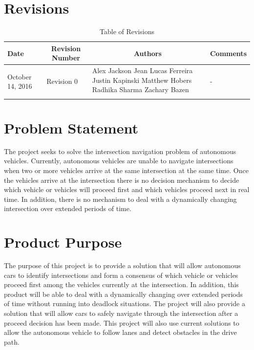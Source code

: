 \documentclass [12pt]{article}
\begin{document}

\tableofcontents
\listoftables

\pagebreak


\section{Revisions}
\begin{longtable}{| p{ } | p{ } | p{ } | p{ } |}

\hline 
\centering \textbf{Date} & 
\multicolumn{1}{c}{\textbf {Revision Number}} &
\multicolumn{1}{|c}{\textbf {Authors}} & 
\multicolumn{1}{|c|}{\textbf {Comments}} \\ \hline

\multirow{4}{*}{\centering October 14, 2016}  & 
\multirow{4}{*}{Revision 0}& 
{Alex Jackson \newline
		Jean Lucas Ferreira \newline
		Justin Kapinski\newline
		Matthew Hobers\newline
		Radhika Sharma\newline
		Zachary Bazen}
 &
\multirow{4}{*}{-} \\ 
\hline 

\caption{Table of Revisions} 
\end{longtable}

\pagebreak

\section{Problem Statement}
The project seeks to solve the intersection navigation problem of autonomous vehicles. Currently, autonomous vehicles are unable to navigate intersections when two or more vehicles arrive at the same intersection at the same time. Once the vehicles arrive at the intersection there is no decision mechanism to decide which vehicle or vehicles will proceed first and which vehicles proceed next in real time. In addition, there is no mechanism to deal with a dynamically changing intersection over extended periods of time.

\section{Product Purpose}
The purpose of this  project is to provide a solution that will allow autonomous cars to identify intersections and form a consensus of which vehicle or vehicles proceed first among the vehicles currently at the  intersection. In addition, this product will be able to deal with a dynamically changing over extended periods of time without running into deadlock situations. The project will also provide a solution that will allow cars to safely navigate through the intersection after a proceed decision has been made. This project will also use current solutions to allow the autonomous vehicle to follow lanes and detect obstacles in the drive path. 
\end{document}
